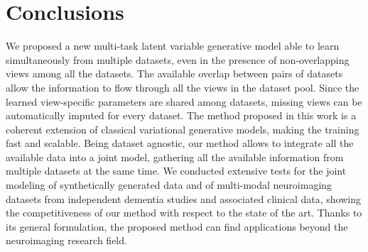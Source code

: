\section{Conclusions}
We proposed a new multi-task latent variable generative model able to learn simultaneously from multiple datasets, even in the presence of non-overlapping views among all the datasets.
The available overlap between pairs of datasets allow the information to flow through all the views in the dataset pool.
Since the learned view-specific parameters are shared among datasets, missing views can be automatically imputed for every dataset.
The method proposed in this work is a coherent extension of classical variational generative models, making the training fast and scalable.
Being dataset agnostic, our method allows to integrate all the available data into a joint model, gathering  all the available information from multiple datasets at the same time.
We conducted extensive tests for the joint modeling of synthetically generated data and of multi-modal neuroimaging datasets from independent dementia studies and associated clinical data, showing the competitiveness of our method with respect to the state of the art.
Thanks to its general formulation, the proposed method can find applications beyond the neuroimaging research field.
